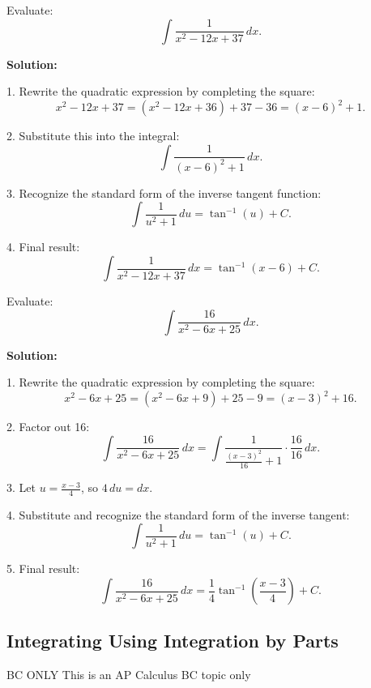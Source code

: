 \documentclass[12pt]{article}
\theoremstyle{beautifulthm}
\begin{document}
\begin{tcolorbox}[colback=examplebg, colframe=red!75!black, title=\textbf{EXAMPLE 5: Find the Integral of the Function}, fonttitle=\bfseries, sharp corners]
Evaluate:
\[
\int \frac{1}{x^2 - 12x + 37} \, dx.
\]


\tcblower
\textbf{Solution:}

1. Rewrite the quadratic expression by completing the square:
   \[
   x^2 - 12x + 37 = \left(x^2 - 12x + 36\right) + 37 - 36 = \left(x - 6\right)^2 + 1.
   \]

2. Substitute this into the integral:
   \[
   \int \frac{1}{(x - 6)^2 + 1} \, dx.
   \]

3. Recognize the standard form of the inverse tangent function:
   \[
   \int \frac{1}{u^2 + 1} \, du = \tan^{-1}(u) + C.
   \]

4. Final result:
   \[
   \int \frac{1}{x^2 - 12x + 37} \, dx = \tan^{-1}(x - 6) + C.
   \]
\end{tcolorbox}


\begin{tcolorbox}[colback=examplebg, colframe=red!75!black, title=\textbf{EXAMPLE 7: Find the Integral of the Function}, fonttitle=\bfseries, sharp corners]
Evaluate:
\[
\int \frac{16}{x^2 - 6x + 25} \, dx.
\]


\tcblower
\textbf{Solution:} 

1. Rewrite the quadratic expression by completing the square:
   \[
   x^2 - 6x + 25 = \left(x^2 - 6x + 9\right) + 25 - 9 = \left(x - 3\right)^2 + 16.
   \]

2. Factor out 16:
   \[
   \int \frac{16}{x^2 - 6x + 25} \, dx = \int \frac{1}{\frac{\left(x - 3\right)^2}{16} + 1} \cdot \frac{16}{16} \, dx.
   \]

3. Let \( u = \frac{x - 3}{4} \), so \( 4 \, du = dx \).

4. Substitute and recognize the standard form of the inverse tangent:
   \[
   \int \frac{1}{u^2 + 1} \, du = \tan^{-1}(u) + C.
   \]

5. Final result:
   \[
   \int \frac{16}{x^2 - 6x + 25} \, dx = \frac{1}{4} \tan^{-1}\left(\frac{x - 3}{4}\right) + C.
   \]
\end{tcolorbox}
\newpage
\subsection{Integrating Using Integration by Parts}
\begin{Note}{BC ONLY}{}
    This is an AP Calculus BC topic only
\end{Note}
\end{document}
